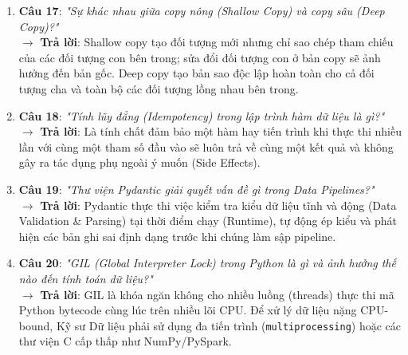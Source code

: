 \begin{enumerate}
    $\rightarrow$ \textbf{Trả lời}: Đọc dữ liệu theo từng khối (\texttt{chunksize}) qua \texttt{pd.read\_csv(file, chunksize=100000)}; tối ưu hóa kiểu dữ liệu cột (\texttt{category}, \texttt{int32} thay vì \texttt{int64}); hoặc sử dụng các công cụ hiện đại như \textbf{DuckDB} hoặc \textbf{Polars}.
    \item \textbf{Câu 17}: \textit{"Sự khác nhau giữa copy nông (Shallow Copy) và copy sâu (Deep Copy)?"} \\
    $\rightarrow$ \textbf{Trả lời}: Shallow copy tạo đối tượng mới nhưng chỉ sao chép tham chiếu của các đối tượng con bên trong; sửa đổi đối tượng con ở bản copy sẽ ảnh hưởng đến bản gốc. Deep copy tạo bản sao độc lập hoàn toàn cho cả đối tượng cha và toàn bộ các đối tượng lồng nhau bên trong.
    \item \textbf{Câu 18}: \textit{"Tính lũy đẳng (Idempotency) trong lập trình hàm dữ liệu là gì?"} \\
    $\rightarrow$ \textbf{Trả lời}: Là tính chất đảm bảo một hàm hay tiến trình khi thực thi nhiều lần với cùng một tham số đầu vào sẽ luôn trả về cùng một kết quả và không gây ra tác dụng phụ ngoài ý muốn (Side Effects).
    \item \textbf{Câu 19}: \textit{"Thư viện Pydantic giải quyết vấn đề gì trong Data Pipelines?"} \\
    $\rightarrow$ \textbf{Trả lời}: Pydantic thực thi việc kiểm tra kiểu dữ liệu tĩnh và động (Data Validation \& Parsing) tại thời điểm chạy (Runtime), tự động ép kiểu và phát hiện các bản ghi sai định dạng trước khi chúng làm sập pipeline.
    \item \textbf{Câu 20}: \textit{"GIL (Global Interpreter Lock) trong Python là gì và ảnh hưởng thế nào đến tính toán dữ liệu?"} \\
    $\rightarrow$ \textbf{Trả lời}: GIL là khóa ngăn không cho nhiều luồng (threads) thực thi mã Python bytecode cùng lúc trên nhiều lõi CPU. Để xử lý dữ liệu nặng CPU-bound, Kỹ sư Dữ liệu phải sử dụng đa tiến trình (\texttt{multiprocessing}) hoặc các thư viện C cấp thấp như NumPy/PySpark.
\end{enumerate}

